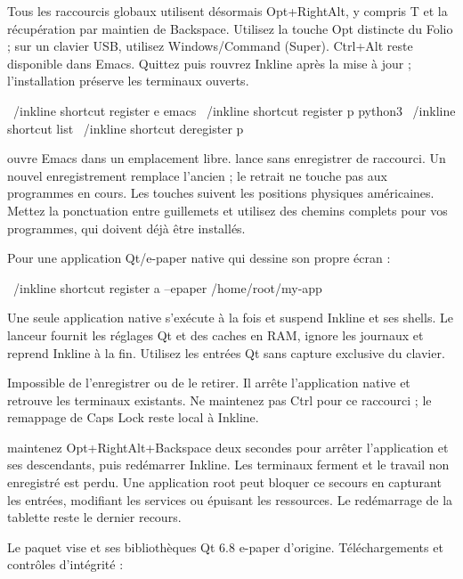 Tous les raccourcis globaux utilisent désormais Opt+RightAlt, y compris T et la récupération par maintien de Backspace. Utilisez la touche Opt distincte du Folio ; sur un clavier USB, utilisez Windows/Command (Super). Ctrl+Alt reste disponible dans Emacs. Quittez puis rouvrez Inkline après la mise à jour ; l’installation préserve les terminaux ouverts.

\begin{shell}
~/inkline shortcut register e emacs
~/inkline shortcut register p python3
~/inkline shortcut list
~/inkline shortcut deregister p
\end{shell}

 ouvre Emacs dans un emplacement libre.
 lance sans enregistrer de raccourci.
Un nouvel enregistrement remplace l'ancien ; le retrait ne touche pas aux
programmes en cours. Les touches suivent les positions physiques américaines.
Mettez la ponctuation entre guillemets et utilisez des chemins complets pour
vos programmes, qui doivent déjà être installés.

Pour une application Qt/e-paper native qui dessine son propre écran :
\begin{shell}
~/inkline shortcut register a --epaper /home/root/my-app
\end{shell}
Une seule application native s'exécute à la fois et suspend Inkline et ses shells.
Le lanceur fournit les réglages Qt et des caches en RAM, ignore les journaux et
reprend Inkline à la fin. Utilisez les entrées Qt sans capture exclusive du clavier.

\begin{notice}
 Impossible de l'enregistrer ou de le retirer.
Il arrête l'application native et retrouve les terminaux existants.
Ne maintenez pas Ctrl pour ce raccourci ; le remappage de Caps Lock reste local à Inkline.
\end{notice}

 maintenez Opt+RightAlt+Backspace deux secondes pour arrêter
l'application et ses descendants, puis redémarrer Inkline. Les terminaux
ferment et le travail non enregistré est perdu. Une application root peut
bloquer ce secours en capturant les entrées, modifiant les services ou épuisant
les ressources. Le redémarrage de la tablette reste le dernier recours.

Le paquet vise  et ses bibliothèques
Qt 6.8 e-paper d'origine. Téléchargements et contrôles d'intégrité :

